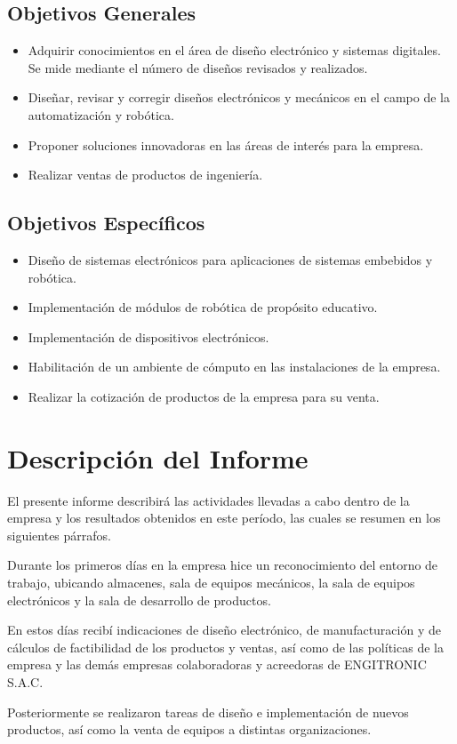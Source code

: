 \subsection{Objetivos Generales}
\begin{itemize}
  \item Adquirir conocimientos en el área de diseño electrónico y sistemas digitales. Se mide mediante el número de diseños revisados y realizados.
  \item Diseñar, revisar y corregir diseños electrónicos y mecánicos en el campo de la automatización y robótica.
  \item Proponer soluciones innovadoras en las áreas de interés para la empresa.
  \item Realizar ventas de productos de ingeniería.
\end{itemize}

\subsection{Objetivos Específicos}
\begin{itemize}
  \item Diseño de sistemas electrónicos para aplicaciones de sistemas embebidos y robótica.
  \item Implementación de módulos de robótica de propósito educativo.
  \item Implementación de dispositivos electrónicos.
  \item Habilitación de un ambiente de cómputo en las instalaciones de la empresa.
  \item Realizar la cotización de productos de la empresa para su venta.
\end{itemize}


\section{Descripción del Informe}
El presente informe describirá las actividades llevadas a cabo dentro de la empresa y los resultados obtenidos en este período, las cuales se resumen en los siguientes párrafos.

Durante los primeros días en la empresa hice un reconocimiento del entorno de trabajo, ubicando almacenes, sala de equipos mecánicos, la sala de equipos electrónicos y la sala de desarrollo de productos.

En estos días recibí indicaciones de diseño electrónico, de manufacturación y de cálculos de factibilidad de los productos y ventas, así como de las políticas de la empresa y las demás empresas colaboradoras y acreedoras de ENGITRONIC S.A.C.

Posteriormente se realizaron tareas de diseño e implementación de nuevos productos, así como la venta de equipos a distintas organizaciones.